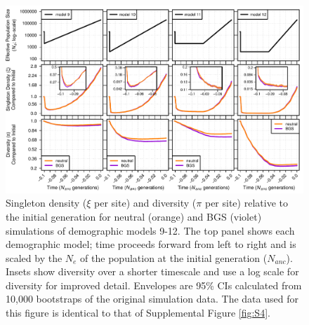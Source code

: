 \documentclass[9pt,twocolumn,twoside]{rilabRxiv}
\begin{document}
\begin{figure}[h!]
\includegraphics[width=0.8\linewidth]{figures/FigS8.pdf}
\caption{Singleton density ($\xi$ per site) and diversity ($\pi$ per site) relative to the initial generation for neutral (orange) and BGS (violet) simulations of demographic models 9-12.
The top panel shows each demographic model; time proceeds forward from left to right and is scaled by the $N_e$ of the population at the initial generation ($N_{anc}$).
Insets show diversity over a shorter timescale and use a log scale for diversity for improved detail.
Envelopes are 95\% CIs calculated from 10,000 bootstraps of the original simulation data.
The data used for this figure is identical to that of Supplemental Figure \ref{fig:S4}.}
\label{fig:S8}
\end{figure}
\pagebreak
\end{document}
